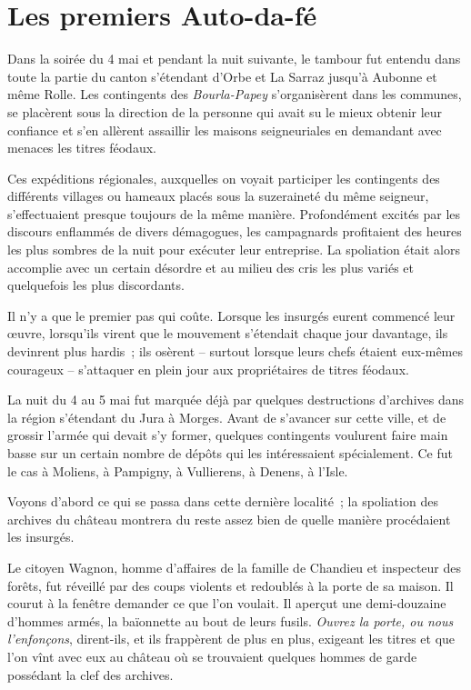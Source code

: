 \documentclass[french,twoside]{book} %
\begin{document}
\section[{Les premiers Auto-da-fé}]{Les premiers Auto-da-fé}
\noindent Dans la soirée du 4 mai et pendant la nuit suivante, le tambour fut entendu dans toute la partie du canton s’étendant d’Orbe et La Sarraz jusqu’à Aubonne et même Rolle. Les contingents des \emph{Bourla-Papey} s’organisèrent dans les communes, se placèrent sous la direction de la personne qui avait su le mieux obtenir leur confiance et s’en allèrent assaillir les maisons seigneuriales en demandant avec menaces les titres féodaux.\par
Ces expéditions régionales, auxquelles on voyait participer les contingents des différents villages ou hameaux placés sous la suzeraineté du même seigneur, s’effectuaient presque toujours de la même manière. Profondément excités par les discours enflammés de divers démagogues, les campagnards profitaient des heures les plus sombres de la nuit pour exécuter leur entreprise. La spoliation était alors accomplie avec un certain désordre et au milieu des cris les plus variés et quelquefois les plus discordants.\par
Il n’y a que le premier pas qui coûte. Lorsque les insurgés eurent commencé leur œuvre, lorsqu’ils virent que le mouvement s’étendait chaque jour davantage, ils devinrent plus hardis ; ils osèrent – surtout lorsque leurs chefs étaient eux-mêmes courageux – s’attaquer en plein jour aux propriétaires de titres féodaux.\par
La nuit du 4 au 5 mai fut marquée déjà par quelques destructions d’archives dans la région s’étendant du Jura à Morges. Avant de s’avancer sur cette ville, et de grossir l’armée qui devait s’y former, quelques contingents voulurent faire main basse sur un certain nombre de dépôts qui les intéressaient spécialement. Ce fut le cas à Moliens, à Pampigny, à Vullierens, à Denens, à l’Isle.\par
Voyons d’abord ce qui se passa dans cette dernière localité ; la spoliation des archives du château montrera du reste assez bien de quelle manière procédaient les insurgés.\par
Le citoyen Wagnon, homme d’affaires de la famille de Chandieu et inspecteur des forêts, fut réveillé par des coups violents et redoublés à la porte de sa maison. Il courut à la fenêtre demander ce que l’on voulait. Il aperçut une demi-douzaine d’hommes armés, la baïonnette au bout de leurs fusils. \emph{Ouvrez la porte, ou nous l’enfonçons}, dirent-ils, et ils frappèrent de plus en plus, exigeant les titres et que l’on vînt avec eux au château où se trouvaient quelques hommes de garde possédant la clef des archives.\par
\end{document}
